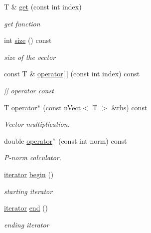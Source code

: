 \begin{DoxyCompactItemize}
T \& \hyperlink{classnVect_a4b757cc98836654ee2929197d40d9055}{get} (const int index)
\begin{DoxyCompactList}\small\item\em get function \end{DoxyCompactList}\item 
int \hyperlink{classnVect_a5cf871204b41c5cd97055b3c4ee9607c}{size} () const
\begin{DoxyCompactList}\small\item\em size of the vector \end{DoxyCompactList}\item 
const T \& \hyperlink{classnVect_a65b439185fd34563833ede9390612f1c}{operator\mbox{[}$\,$\mbox{]}} (const int index) const
\begin{DoxyCompactList}\small\item\em \mbox{[}\mbox{]} operator const \end{DoxyCompactList}\item 
T \hyperlink{classnVect_ac5933c6480457c627ca43a8b9d1cfbaf}{operator$\ast$} (const \hyperlink{classnVect}{n\+Vect}$<$ T $>$ \&rhs) const
\begin{DoxyCompactList}\small\item\em Vector multiplication. \end{DoxyCompactList}\item 
double \hyperlink{classnVect_a32237bab9097b7b392c467a79d858d1a}{operator$^\wedge$} (const int norm) const
\begin{DoxyCompactList}\small\item\em P-\/norm calculator. \end{DoxyCompactList}\item 
\hyperlink{classnVect_1_1iterator}{iterator} \hyperlink{classnVect_a0daf09e1f15ac627815d57f777ecc417}{begin} ()
\begin{DoxyCompactList}\small\item\em starting iterator \end{DoxyCompactList}\item 
\hyperlink{classnVect_1_1iterator}{iterator} \hyperlink{classnVect_a44a13c3cb3ede92ae23298920b1d88bf}{end} ()
\begin{DoxyCompactList}\small\item\em ending iterator \end{DoxyCompactList}\end{DoxyCompactItemize}
